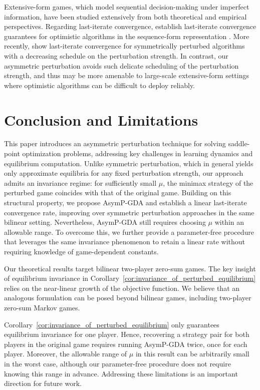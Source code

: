 \documentclass{article}
\theoremstyle{plain}
\begin{document}
Extensive-form games, which model sequential decision-making under imperfect information, have been studied extensively from both theoretical and empirical perspectives.
Regarding last-iterate convergence, \citet{lee2021last} establish last-iterate convergence guarantees for optimistic algorithms in the sequence-form representation \citep{VONSTENGEL1996220}.
More recently, \citet{liu2022power} show last-iterate convergence for symmetrically perturbed algorithms with a decreasing schedule on the perturbation strength.
In contrast, our asymmetric perturbation avoids such delicate scheduling of the perturbation strength, and thus may be more amenable to large-scale extensive-form settings where optimistic algorithms can be difficult to deploy reliably.


\section{Conclusion and Limitations}
This paper introduces an asymmetric perturbation technique for solving saddle-point optimization problems, addressing key challenges in learning dynamics and equilibrium computation.
Unlike symmetric perturbation, which in general yields only approximate equilibria for any fixed perturbation strength, our approach admits an invariance regime: for sufficiently small $\mu$, the minimax strategy of the perturbed game coincides with that of the original game.
Building on this structural property, we propose AsymP-GDA and establish a linear last-iterate convergence rate, improving over symmetric perturbation approaches in the same bilinear setting.
Nevertheless, AsymP-GDA still requires choosing $\mu$ within an allowable range.
To overcome this, we further provide a parameter-free procedure that leverages the same invariance phenomenon to retain a linear rate without requiring knowledge of game-dependent constants.



Our theoretical results target bilinear two-player zero-sum games.
The key insight of equilibrium invariance in Corollary~\ref{cor:invariance_of_perturbed_equilibrium} relies on the near-linear growth of the objective function.
We believe that an analogous formulation can be posed beyond bilinear games, including two-player zero-sum Markov games.

Corollary~\ref{cor:invariance_of_perturbed_equilibrium} only guarantees equilibrium invariance for one player.
Hence, recovering a strategy pair for both players in the original game requires running AsymP-GDA twice, once for each player.
Moreover, the allowable range of $\mu$ in this result can be arbitrarily small in the worst case, although our parameter-free procedure does not require knowing this range in advance.
Addressing these limitations is an important direction for future work.
\end{document}
